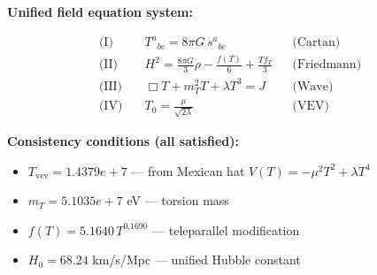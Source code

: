 
\textbf{Unified field equation system:}

\begin{align}
  \text{(I)} \quad & T^a{}_{bc} = 8\pi G \, s^a{}_{bc} && \text{(Cartan)} \\
  \text{(II)} \quad & H^2 = \frac{8\pi G}{3}\rho - \frac{f(T)}{6} + \frac{Tf_T}{3} && \text{(Friedmann)} \\
  \text{(III)} \quad & \Box T + m_T^2 T + \lambda T^3 = J && \text{(Wave)} \\
  \text{(IV)} \quad & T_0 = \frac{\mu}{\sqrt{2\lambda}} && \text{(VEV)}
\end{align}

\textbf{Consistency conditions (all satisfied):}
\begin{itemize}
  \item $T_{\text{vev}} = 1.4379e+7$ — from Mexican hat $V(T) = -\mu^2 T^2 + \lambda T^4$
  \item $m_T = 5.1035e+7$ eV — torsion mass
  \item $f(T) = 5.1640 \, T^{0.1690}$ — teleparallel modification
  \item $H_0 = 68.24$ km/s/Mpc — unified Hubble constant
\end{itemize}